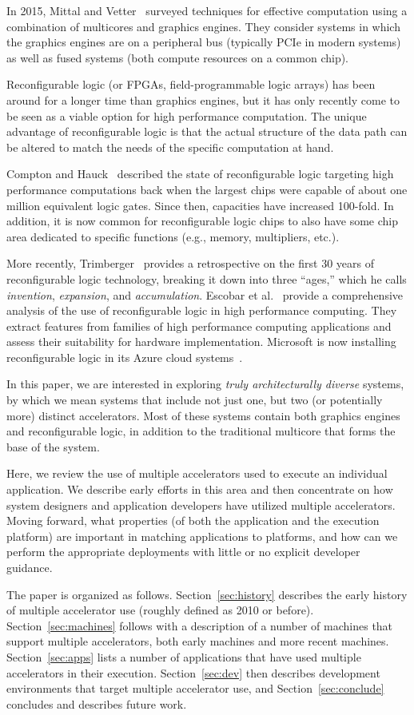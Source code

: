 In 2015, Mittal and Vetter~\cite{mv15} surveyed techniques for effective
computation using a combination of multicores and graphics engines. They
consider systems in which the graphics engines are on a peripheral bus
(typically PCIe in modern systems) as well as fused systems (both compute
resources on a common chip).

Reconfigurable logic (or FPGAs, field-programmable logic arrays) has been
around for a longer time than graphics engines, but it has only recently come
to be seen as a viable option for high performance computation.
The unique advantage of reconfigurable logic is that the actual 
structure of the data path can be altered to match the needs of the specific
computation at hand.

Compton and Hauck~\cite{ch02} described the state of reconfigurable logic
targeting high performance computations back when the largest chips were
capable of about one million equivalent logic gates.  Since then, capacities
have increased 100-fold.  In addition, it is now common for reconfigurable
logic chips to also have some chip area dedicated to specific functions (e.g.,
memory, multipliers, etc.).

More recently, Trimberger~\cite{Trimberger15} provides a retrospective on
the first 30 years of reconfigurable logic technology, breaking it down into
three ``ages,'' which he calls \emph{invention}, \emph{expansion}, and
\emph{accumulation}.  Escobar et al.~\cite{ecv16} provide a comprehensive
analysis of the use of reconfigurable logic in high performance computing.
They extract features from families of high performance computing
applications and assess their suitability for hardware implementation.
Microsoft is now installing reconfigurable logic in its Azure cloud
systems~\cite{ccp+16}.

In this paper, we are interested in exploring \emph{truly architecturally
diverse} systems, by which we mean systems that include not just one, but
two (or potentially more) distinct accelerators.  Most of these systems
contain both graphics engines and reconfigurable logic, in addition to the
traditional multicore that forms the base of the system.

Here, we review the use of multiple accelerators used to execute an individual
application. We describe early efforts in this area and then concentrate on
how system designers and application developers have utilized multiple
accelerators.  Moving forward, what properties (of both the application and
the execution platform) are important in matching applications to platforms,
and how can we perform the appropriate deployments with little or no
explicit developer guidance.

The paper is organized as follows.  Section~\ref{sec:history} describes
the early history of multiple accelerator use (roughly defined as 2010
or before).  Section~\ref{sec:machines}
follows with a description of a number of machines that support multiple
accelerators, both early machines and more recent machines.
Section~\ref{sec:apps} lists a number of applications that have used
multiple accelerators in their execution.
Section~\ref{sec:dev} then describes development
environments that target multiple accelerator use, and
Section~\ref{sec:conclude} concludes and describes future work.

